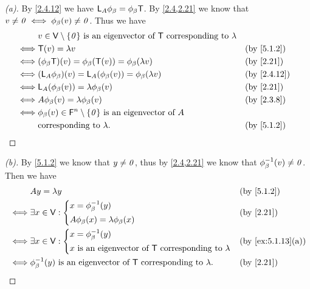 \begin{proof}[(a)]
	By \cref{2.4.12} we have \(\mathsf{L}_A \phi_{\beta} = \phi_{\beta} \mathsf{T}\).
	By \cref{2.4,2.21} we know that \(v \neq \mathit{0} \iff \phi_{\beta}(v) \neq \mathit{0}\).
	Thus we have
	\begin{align*}
		     & v \in \V \setminus \set{\zv} \text{ is an eigenvector of } \T \text{ corresponding to } \lambda                  \\
		\iff & \T(v) = \lambda v                                                                               &  & \by{5.1.2}  \\
		\iff & (\phi_{\beta} \T)(v) = \phi_{\beta}(\T(v)) = \phi_{\beta}(\lambda v)                            &  & \by{2.21}   \\
		\iff & (\L_A \phi_{\beta})(v) = \L_A(\phi_{\beta}(v)) = \phi_{\beta}(\lambda v)                        &  & \by{2.4.12} \\
		\iff & \L_A(\phi_{\beta}(v)) = \lambda \phi_{\beta}(v)                                                 &  & \by{2.21}   \\
		\iff & A \phi_{\beta}(v) = \lambda \phi_{\beta}(v)                                                     &  & \by{2.3.8}  \\
		\iff & \phi_{\beta}(v) \in \vs{F}^n \setminus \set{\zv} \text{ is an eigenvector of } A                                 \\
		     & \text{corresponding to } \lambda.                                                               &  & \by{5.1.2}
	\end{align*}
\end{proof}

\begin{proof}[(b)]
	By \cref{5.1.2} we know that \(y \neq \mathit{0}\), thus by \cref{2.4,2.21} we know that \(\phi_{\beta}^{-1}(v) \neq \mathit{0}\).
	Then we have
	\begin{align*}
		     & A y = \lambda y                                                                          &  & \by{5.1.2} \\
		\iff & \exists x \in \V : \begin{dcases}
			                          x = \phi_{\beta}^{-1}(y) \\
			                          A \phi_{\beta}(x) = \lambda \phi_{\beta}(x)
		                          \end{dcases}                                              &  & \by{2.21}              \\
		\iff & \exists x \in \V : \begin{dcases}
			                          x = \phi_{\beta}^{-1}(y) \\
			                          x \text{ is an eigenvector of } \T \text{ corresponding to } \lambda
		                          \end{dcases}                     &  & \by{ex:5.1.13}[a]                   \\
		\iff & \phi_{\beta}^{-1}(y) \text{ is an eigenvector of } \T \text{ corresponding to } \lambda. &  & \by{2.21}
	\end{align*}
\end{proof}

